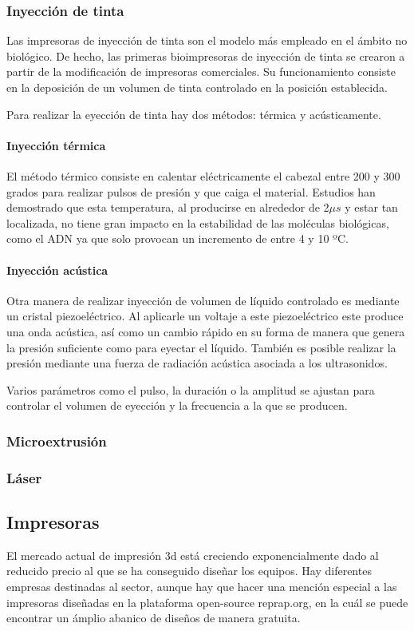 \documentclass[a4paper,12pt]{article}
\begin{document}
\subsubsection{Inyección de tinta}
Las impresoras de inyección de tinta son el modelo más empleado en el ámbito no biológico. De hecho, las primeras bioimpresoras de inyección de tinta se crearon a partir de la modificación de impresoras comerciales. Su funcionamiento consiste en la deposición de un volumen de tinta controlado en la posición establecida.

Para realizar la eyección de tinta hay dos métodos: térmica y acústicamente.

\paragraph{Inyección térmica}
El método térmico consiste en calentar eléctricamente el cabezal entre 200 y 300 grados para realizar pulsos de presión y que caiga el material. Estudios han demostrado que esta temperatura, al producirse en alrededor de 2$\mu s$ y estar tan localizada, no tiene gran impacto en la estabilidad de las moléculas biológicas, como el ADN ya que solo provocan un incremento de entre 4 y 10 ºC.


\paragraph{Inyección acústica}
Otra manera de realizar inyección de volumen de líquido controlado es mediante un cristal piezoeléctrico. Al aplicarle un voltaje a este piezoeléctrico este produce una onda acústica, así como un cambio rápido en su forma de manera que genera la presión suficiente como para eyectar el líquido. También es posible realizar la presión mediante una fuerza de radiación acústica asociada a los ultrasonidos.

Varios parámetros como el pulso, la duración o la amplitud se ajustan para controlar el volumen de eyección y la frecuencia a la que se producen.

\subsubsection{Microextrusión}

\subsubsection{Láser}

\subsection{Impresoras}
El mercado actual de impresión 3d está creciendo exponencialmente dado al reducido precio al que se ha conseguido diseñar los equipos. Hay diferentes empresas destinadas al sector, aunque hay que hacer una mención especial a las impresoras diseñadas en la plataforma open-source reprap.org, en la cuál se puede encontrar un ámplio abanico de diseños de manera gratuita.
\end{document}
